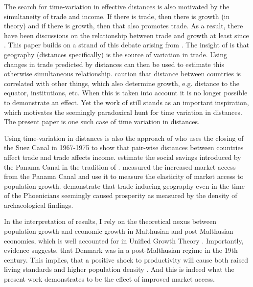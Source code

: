 \documentclass[11pt]{article}
\begin{document}
The search for time-variation in effective distances is also motivated by the simultaneity of trade and income. If there is trade, then there is growth (in theory) and if there is growth, then that also promotes trade. As a result, there have been discussions on the relationship between trade and growth at least since \cite{ricardo1817principles}. This paper builds on a strand of this debate arising from \cite{Frankel1999}. The insight of \cite{Frankel1999} is that geography (distances specifically) is the source of variation in trade. Using changes in trade predicted by distances can then be used to estimate this otherwise simultaneous relationship. \cite{Rodriguez2001} caution that distance between countries is correlated with other things, which also determine growth, e.g. distance to the equator, institutions, etc. When this is taken into account it is no longer possible to demonstrate an effect. Yet the work of \cite{Frankel1999} still stands as an important inspiration, which motivates the seemingly paradoxical hunt for time variation in distances. The present paper is one such case of time variation in distances.

Using time-variation in distances is also the approach of \cite{Feyrer2021} who uses the closing of the Suez Canal in 1967-1975 to show that pair-wise distances between countries affect trade and trade affects income. \cite{Maurer2008} estimate the social savings introduced by the Panama Canal in the tradition of \cite{Fogel1964}. \cite{rauch2022a} measured the increased market access from the Panama Canal and use it to measure the elasticity of market access to population growth. \cite{Bakker2021Phonecians} demonstrate that trade-inducing geography even in the time of the Phoenicians seemingly caused prosperity as measured by the density of archaeological findings. 

In the interpretation of results, I rely on the theoretical nexus between population growth and economic growth in Malthusian and post-Malthusian economies, which is well accounted for in Unified Growth Theory \citep{Galor2005, Galor2011}. Importantly, evidence suggests, that Denmark was in a post-Malthusian regime in the 19th century. This implies, that a positive shock to productivity will cause both raised living standards and higher population density \citep{Jensen2022, Klemp2016}. And this is indeed what the present work demonstrates to be the effect of improved market access. 
\end{document}
